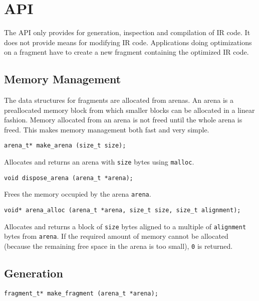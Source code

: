 \documentclass{article}
\newcommand{\cc}[1]{\texttt{#1}} %
\begin{document}
\section{API}

The API only provides for generation, inspection and compilation of IR
code.  It does not provide means for modifying IR code.  Applications
doing optimizations on a fragment have to create a new fragment
containing the optimized IR code.

\subsection{Memory Management}

The data structures for fragments are allocated from arenas.  An arena
is a preallocated memory block from which smaller blocks can be
allocated in a linear fashion.  Memory allocated from an arena is not
freed until the whole arena is freed.  This makes memory management
both fast and very simple.

\begin{verbatim}
arena_t* make_arena (size_t size);
\end{verbatim}

Allocates and returns an arena with \cc{size} bytes using \cc{malloc}.

\begin{verbatim}
void dispose_arena (arena_t *arena);
\end{verbatim}

Frees the memory occupied by the arena \cc{arena}.

\begin{verbatim}
void* arena_alloc (arena_t *arena, size_t size, size_t alignment);
\end{verbatim}

Allocates and returns a block of \cc{size} bytes aligned to a multiple
of \cc{alignment} bytes from \cc{arena}.  If the required amount of
memory cannot be allocated (because the remaining free space in the
arena is too small), \cc{0} is returned.

\subsection{Generation}

\begin{verbatim}
fragment_t* make_fragment (arena_t *arena);
\end{verbatim}
\end{document}
